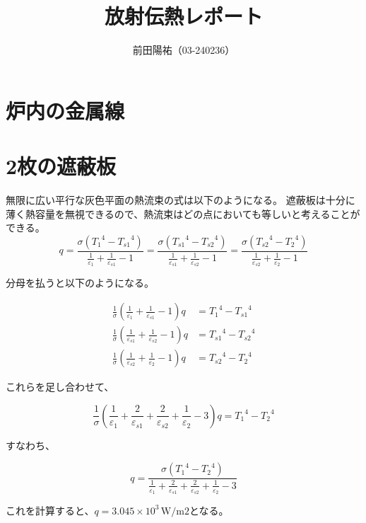 \documentclass{jsarticle}
\begin{document}
\title{放射伝熱レポート}
\author{前田陽祐（03-240236）}
\maketitle
\section{炉内の金属線}
\section{2枚の遮蔽板}
無限に広い平行な灰色平面の熱流束の式は以下のようになる。
遮蔽板は十分に薄く熱容量を無視できるので、熱流束はどの点においても等しいと考えることができる。
\begin{equation}
	q=\frac{
		\sigma({T_1}^4 - {T_{s1}}^4)
	}{
		\frac{1}{\varepsilon_1} +
		\frac{1}{\varepsilon_{s1}} - 1
	}=\frac{
		\sigma({T_{s1}}^4 - {T_{s2}}^4)
	}{
		\frac{1}{\varepsilon_{s1}} +
		\frac{1}{\varepsilon_{s2}} - 1
	}=\frac{
		\sigma({T_{s2}}^4 - {T_{2}}^4)
	}{
		\frac{1}{\varepsilon_{s2}} +
		\frac{1}{\varepsilon_{2}} - 1
	}
\end{equation}

分母を払うと以下のようになる。

\begin{align}
	\frac{1}{\sigma}
	\left(
	\frac{1}{\varepsilon_1} +
	\frac{1}{\varepsilon_{s1}} - 1
	\right) q & =
	{T_1}^4 - {T_{s1}}^4    \\
	\frac{1}{\sigma}
	\left(
	\frac{1}{\varepsilon_{s1}} +
	\frac{1}{\varepsilon_{s2}} - 1
	\right) q & =
	{T_{s1}}^4 - {T_{s2}}^4 \\
	\frac{1}{\sigma}
	\left(
	\frac{1}{\varepsilon_{s2}} +
	\frac{1}{\varepsilon_{2}} - 1
	\right) q & =
	{T_{s2}}^4 - {T_{2}}^4
\end{align}

これらを足し合わせて、

\begin{equation}
	\frac{1}{\sigma}
	\left(
	\frac{1}{\varepsilon_1} +
	\frac{2}{\varepsilon_{s1}} +
	\frac{2}{\varepsilon_{s2}} +
	\frac{1}{\varepsilon_{2}} - 3
	\right) q =
	{T_1}^4 - {T_2}^4
\end{equation}

すなわち、

\begin{equation}
	q = \frac{
		\sigma({T_1}^4 - {T_2}^4)
	}{
		\frac{1}{\varepsilon_1} +
		\frac{2}{\varepsilon_{s1}} +
		\frac{2}{\varepsilon_{s2}} +
		\frac{1}{\varepsilon_{2}} - 3
	}
\end{equation}

これを計算すると、$q = 3.045\times10^3 \mathrm{\,W/m2}$となる。
\end{document}
